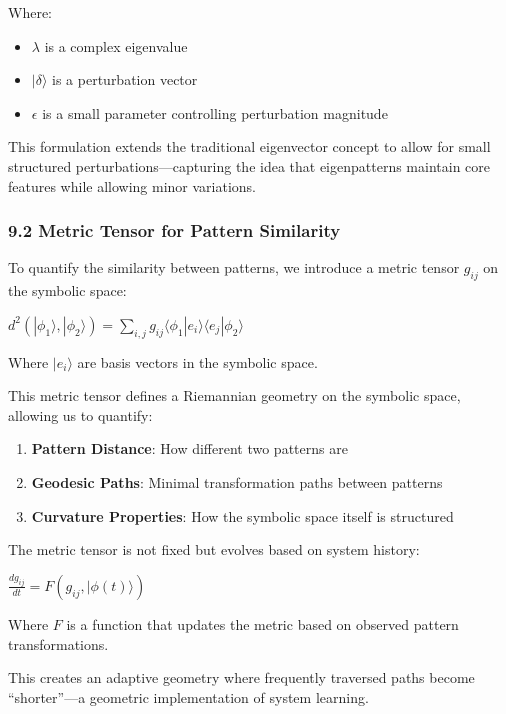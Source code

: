 \documentclass[12pt]{article}
\providecommand{\tightlist}{%
  \setlength{\itemsep}{0pt}\setlength{\parskip}{0pt}}
\begin{document}
Where:

\begin{itemize}
\tightlist
\item
  \(\lambda\) is a complex eigenvalue
\item
  \(|\delta\rangle\) is a perturbation vector
\item
  \(\epsilon\) is a small parameter controlling perturbation magnitude
\end{itemize}

This formulation extends the traditional eigenvector concept to allow
for small structured perturbations---capturing the idea that
eigenpatterns maintain core features while allowing minor variations.

\subsubsection{9.2 Metric Tensor for Pattern
Similarity}\label{metric-tensor-for-pattern-similarity}

To quantify the similarity between patterns, we introduce a metric
tensor \(g_{ij}\) on the symbolic space:

\(d^2(|\phi_1\rangle, |\phi_2\rangle) = \sum_{i,j} g_{ij} \langle\phi_1|e_i\rangle \langle e_j|\phi_2\rangle\)

Where \(|e_i\rangle\) are basis vectors in the symbolic space.

This metric tensor defines a Riemannian geometry on the symbolic space,
allowing us to quantify:

\begin{enumerate}
\def\labelenumi{\arabic{enumi}.}
\tightlist
\item
  \textbf{Pattern Distance}: How different two patterns are
\item
  \textbf{Geodesic Paths}: Minimal transformation paths between patterns
\item
  \textbf{Curvature Properties}: How the symbolic space itself is
  structured
\end{enumerate}

The metric tensor is not fixed but evolves based on system history:

\(\frac{dg_{ij}}{dt} = F(g_{ij}, |\phi(t)\rangle)\)

Where \(F\) is a function that updates the metric based on observed
pattern transformations.

This creates an adaptive geometry where frequently traversed paths
become ``shorter''---a geometric implementation of system learning.
\end{document}

